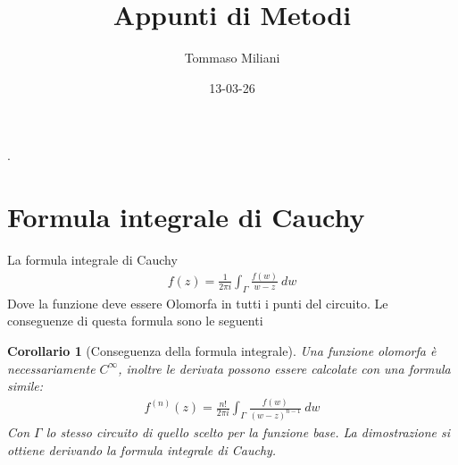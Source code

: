 \documentclass[a4paper, oneside]{article}
\title{Appunti di Metodi}
\author{Tommaso Miliani}
\date{13-03-26}
\begin{document}
                {}          %
                {}          %
                {\slshape}  %
                {}          %
                {\bfseries} %
                {.}         %
                {\newline}  %
                {}          %
\theoremstyle{theoremEnv}

\newtheorem{definition}{Definizione}[section]
\newtheorem{theorem}{Teorema}[section]
\newtheorem{lemma}{Proposizione}[section]
\newtheorem{observation}{Osservazione}[section]
\newtheorem{corollary}{Corollario}[theorem]
\newtheorem{example}{Esempio}[section]
\newtheorem{remark}{Enunciato}[section]

\maketitle

\section{Formula integrale di Cauchy}
La formula integrale di Cauchy
\begin{align}
    f(z) = \frac{1}{2\pi i} \int_{\Gamma}^{} \frac{f(w)}{w - z} \ dw 
\end{align}
Dove la funzione deve essere Olomorfa in tutti i punti del circuito. Le conseguenze
di questa formula sono le seguenti

\begin{corollary}[Conseguenza della formula integrale]
    Una funzione olomorfa è necessariamente $C^{\infty }$, inoltre 
    le derivata possono essere calcolate con una formula simile:
    \begin{align}
        f^{(n)}(z) = \frac{n!}{2\pi i} \int_{\Gamma} \frac{f(w)}{(w - z)^{ n - 1}}\ dw 
    \end{align}
    Con $\Gamma$ lo stesso circuito di quello scelto per la funzione base. La dimostrazione si ottiene derivando 
    la formula integrale di Cauchy.
\end{corollary}
\end{document}
